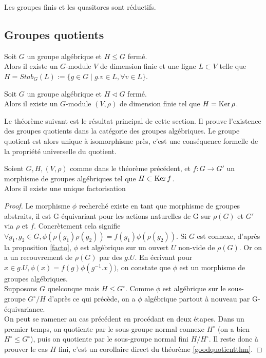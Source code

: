 \begin{ex}
Les groupes finis et les quasitores sont réductifs.
\end{ex}

\subsection{Groupes quotients}
\begin{thm}
Soit $G$ un groupe algébrique et $H\leq G$ fermé. \\Alors il existe un $G$-module $V$ de dimension finie et une ligne $L\subset V$ telle que $H=Stab_G(L):=\lbrace g\in G\mid g.v\in L,\forall v\in L\rbrace$.
\end{thm}

\begin{thm}
Soit $G$ un groupe algébrique et $H\lhd G$ fermé. \\Alors il existe un $G$-module $(V, \rho)$ de dimension finie tel que $H=\operatorname{Ker}{\rho}$.
\end{thm}
Le théorème suivant est le résultat principal de cette section. Il prouve l'existence des groupes quotients dans la catégorie des groupes algébriques. Le groupe quotient est alors unique à isomorphisme près, c'est une conséquence formelle de la propriété universelle du quotient.
\begin{thm}[Car. 0]\label{groupequotient}
Soient $G, H, (V, \rho)$ comme dans le théorème précédent, et $f:G \rightarrow G'$ un morphisme de groupes algébriques tel que $H\subset \operatorname{Ker} f$.\\
Alors il existe une unique factorisation 	
\end{thm}
\begin{proof}
	Le morphisme $\phi$ recherché existe en tant que morphisme de groupes abstraits, il est G-équivariant pour les actions naturelles de G sur $\rho(G)$ et $G'$ via $\rho$ et $f$. Concrètement cela signifie $\forall g_1, g_2 \in G, \phi(\rho(g_1)\rho(g_2))=f(g_1)\phi(\rho(g_2))$. Si $G$ est connexe, d'après la proposition \ref{facto}, $\phi$ est algébrique sur un ouvert $U$ non-vide de $\rho(G)$. Or on a un recouvrement de $\rho(G)$ par des $g.U$. En écrivant pour $x\in g.U,  \phi(x)=f(g)\phi(g^{-1}.x))$, on constate que $\phi$ est un morphisme de groupes algébriques.
	\\Supposons $G$ quelconque mais $H\leq G^\circ$. Comme $\phi$ est algébrique sur le sous-groupe $G^\circ/H$ d'après ce qui précède, on a $\phi$ algébrique partout à nouveau par G-équivariance.\\
	On peut se ramener au cas précédent en procédant en deux étapes. Dans un premier temps, on quotiente par le sous-groupe normal connexe $H^\circ$ (on a bien $H^\circ\leq G^\circ$), puis on quotiente par le sous-groupe normal fini $H/H^\circ$. Il reste donc à prouver le cas $H$ fini, c'est un corollaire direct du théorème \ref{goodquotientthm}.
	\end{proof}
